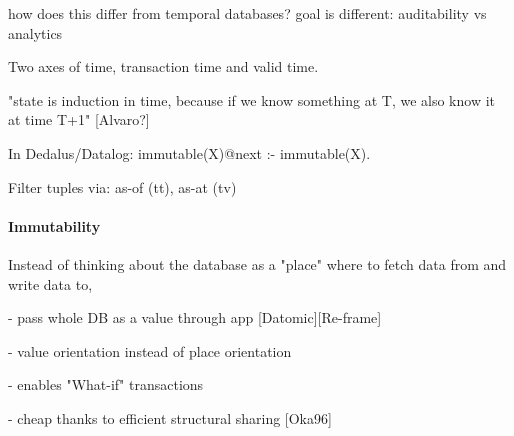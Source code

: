 how does this differ from temporal databases?
goal is different: auditability vs analytics

Two axes of time, transaction time and valid time. \cite{snodgrass1992temporal}

"state is induction in time, because if we know something at T, we also know it at time T+1" [Alvaro?]

In Dedalus/Datalog: immutable(X)@next :- immutable(X).

Filter tuples via: as-of (tt), as-at (tv)


\paragraph{Immutability}
Instead of thinking about the database as a "place" where to fetch data from and write data to,

- pass whole DB as a value through app [Datomic][Re-frame]

- value orientation instead of place orientation

- enables "What-if" transactions

- cheap thanks to efficient structural sharing [Oka96]
